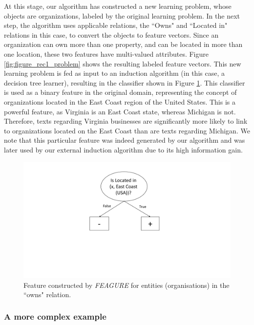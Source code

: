 \documentclass[twoside,11pt]{article}
\theoremstyle{definition}
\begin{document}
At this stage, our algorithm has constructed a new learning problem, whose objects are organizations, labeled by the original learning problem. 
In the next step, the algorithm uses applicable relations, the ``Owns" and ``Located in" relations in this case, to convert the objects to feature vectors.
Since an organization can own more than one property, and can be located in more than one location, these two features have multi-valued attributes. Figure \ref{fig:figure_rec1_problem} shows the resulting labeled feature vectors.
This new learning problem is fed as input to an induction algorithm (in this case, a decision tree learner), resulting in the classifier shown in Figure \ref{fig:feature_eastcoast_rel}. This classifier is used as a binary feature in the original domain, representing the concept of organizations located in the East Coast region of the United States.
This is a powerful feature, as Virginia is an East Coast state, whereas Michigan is not. Therefore, texts regarding Virginia businesses are significantly more likely to link to organizations located on the East Coast than are texts regarding Michigan. We note that this particular feature was indeed generated by our algorithm and was later used by our external induction algorithm due to its high information gain.

\begin{figure}[!h]
	\centering
	\includegraphics[width=0.5\linewidth]{figure_rec1_feature_new}
	\caption{Feature constructed by \emph{FEAGURE} for entities (organisations) in the ``owns" relation.}
	\label{fig:feature_eastcoast_rel}
\end{figure}

\subsubsection{A more complex example}
\end{document}
